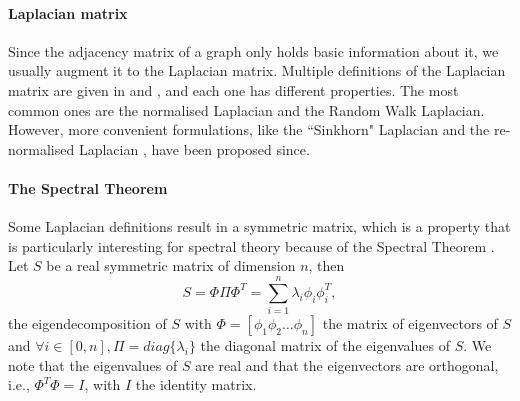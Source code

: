 \paragraph{Laplacian matrix}
Since the adjacency matrix of a graph only holds basic information about it, we usually augment it to the Laplacian matrix.
Multiple definitions of the Laplacian matrix are given in \cite{chung_spectral_1997} and \cite{siam_slides_2016}, and each one has different properties.
The most common ones are the normalised Laplacian and the Random Walk Laplacian.
However, more convenient formulations, like the ``Sinkhorn" Laplacian \cite{milanfar_symmetrizing_2013} and the re-normalised Laplacian \cite{siam_slides_2016} \cite{milanfar_new_2016}, have been proposed since.

\paragraph{The Spectral Theorem}
Some Laplacian definitions result in a symmetric matrix, which is a property that is particularly interesting for spectral theory because of the Spectral Theorem \cite{zhang_spectral_2010}.
Let \(S\) be a real symmetric matrix of dimension \(n\), then
\[S = \Phi \Pi \Phi^T = \sum_{i=1}^n \lambda_i \phi_i \phi_i^T,\]
the eigendecomposition of \(S\) with \(\Phi = [\phi_1 \phi_2 \dots \phi_n ]\) the matrix of eigenvectors of \(S\) and \(\forall i \in [0,n], \Pi = diag\{\lambda_i\}\) the diagonal matrix of the eigenvalues of \(S\).
We note that the eigenvalues of \(S\) are real and that the eigenvectors are orthogonal, i.e., \(\Phi^T\Phi = I\), with \(I\) the identity matrix.

%
%
%

